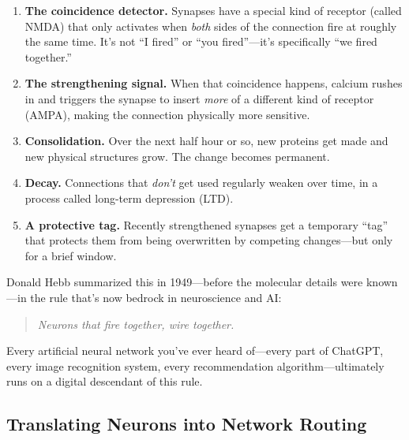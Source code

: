 \documentclass[nobib,justified]{tufte-handout}
\begin{document}
\begin{enumerate}
  \item \textbf{The coincidence detector.} Synapses have a special kind of receptor (called NMDA) that only activates when \emph{both} sides of the connection fire at roughly the same time. It's not ``I fired'' or ``you fired''---it's specifically ``we fired together.''
  \item \textbf{The strengthening signal.} When that coincidence happens, calcium rushes in and triggers the synapse to insert \emph{more} of a different kind of receptor (AMPA), making the connection physically more sensitive.
  \item \textbf{Consolidation.} Over the next half hour or so, new proteins get made and new physical structures grow. The change becomes permanent.
  \item \textbf{Decay.} Connections that \emph{don't} get used regularly weaken over time, in a process called long-term depression (LTD).
  \item \textbf{A protective tag.} Recently strengthened synapses get a temporary ``tag'' that protects them from being overwritten by competing changes---but only for a brief window.
\end{enumerate}

Donald Hebb summarized this in 1949---before the molecular details were known---in the rule that's now bedrock in neuroscience and AI:

\begin{quote}\itshape
Neurons that fire together, wire together.
\end{quote}

Every artificial neural network you've ever heard of---every part of ChatGPT, every image recognition system, every recommendation algorithm---ultimately runs on a digital descendant of this rule.

\subsection{Translating Neurons into Network Routing}
\end{document}
